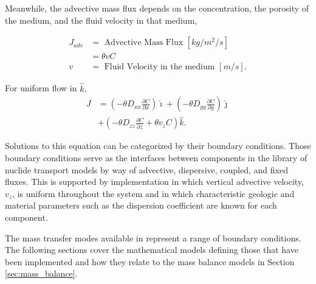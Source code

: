 Meanwhile, the advective mass flux depends on the concentration, the porosity
of the medium, and the fluid velocity in that medium,

    \begin{align}
      J_{adv} &= \mbox{ Advective Mass Flux }[kg/m^2/s]\nonumber\\
      &= \theta vC\nonumber\\
      v &= \mbox{ Fluid Velocity in the medium }[m/s].\nonumber
    \end{align}

For uniform flow in $\hat{k}$,
    \begin{align}
      J &=\left(-\theta D_{xx} \frac{\partial C}{\partial x}
             \right)\hat{\imath}
             + \left( -\theta D_{yy} \frac{\partial C}{\partial y}
            \right)\hat{\jmath}\nonumber\\
            &+ \left( -\theta D_{zz} \frac{\partial C}{\partial z}
             + \theta v_zC \right)\hat{k}.
      \label{unidirflow}
    \end{align}

Solutions to this equation can be categorized by their boundary conditions.
Those boundary conditions serve as the interfaces between components in the
\Cyder library of nuclide transport models by way of advective, dispersive,
coupled, and fixed fluxes.  This is supported by implementation in which
vertical advective velocity, $v_z$, is uniform throughout the system and in which
characteristic geologic and material parameters such as the dispersion
coefficient are known for each component.

The mass transfer modes available in \Cyder represent a range of boundary
conditions. The following sections cover the mathematical models defining those
that have been implemented and how they relate to the mass balance models in
Section \ref{sec:mass_balance}.
